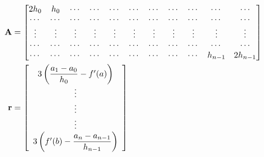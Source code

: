 \documentclass[12pt]{article}
\begin{document}
\begin{description}
\begin{align*}
\mathbf{A} & = \setcounter{MaxMatrixCols}{20}
\begin{bmatrix}
2h_0 & h_0 & \cdots & \cdots & \cdots & \cdots & \cdots & \cdots & \cdots &\cdots & \cdots \\
\cdots & \cdots & \cdots & \cdots & \cdots & \cdots & \cdots & \cdots & \cdots &\cdots & \cdots \\
\vdots & \vdots & \vdots & \vdots & \vdots & \vdots & \vdots & \vdots & \vdots &\vdots & \vdots \\
\cdots & \cdots & \cdots & \cdots & \cdots & \cdots & \cdots & \cdots & \cdots &\cdots & \cdots \\
\cdots & \cdots & \cdots & \cdots & \cdots & \cdots & \cdots & \cdots & \cdots &h_{n-1} & 2h_{n-1} \\
\end{bmatrix}\\
\mathbf{r} & = 
\left[\begin{array}{c}
3\left(\dfrac{a_1-a_0}{h_0} -f'(a)\right) \\
\vdots \\
\vdots \\
\vdots\\
3\left(f'(b) - \dfrac{a_n-a_{n-1}}{h_{n-1}}\right) \\
\end{array}\right]
\end{align*}


\end{description}
\end{document}
